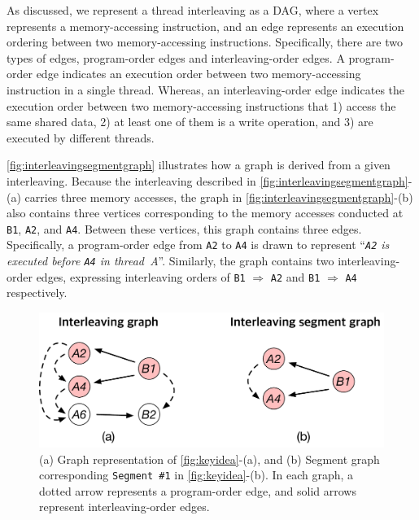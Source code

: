 %




As discussed,
we represent a thread interleaving as a DAG, where
%
a vertex represents a memory-accessing instruction, and an edge
represents an execution ordering between two memory-accessing
instructions.  Specifically, there are two types of edges,
program-order edges and interleaving-order edges.
%
A program-order edge indicates an execution order between two
memory-accessing instruction in a single thread.  Whereas, an
interleaving-order edge indicates the execution order between two
memory-accessing instructions that 1) access the same shared data, 2)
at least one of them is a write operation, and 3) are executed by
different threads.

\autoref{fig:interleavingsegmentgraph} illustrates how a graph is
derived from a given interleaving.
%
Because the interleaving described in
\autoref{fig:interleavingsegmentgraph}-(a) carries three memory
accesses, the graph in \autoref{fig:interleavingsegmentgraph}-(b) also
contains three vertices corresponding to the memory accesses conducted
at \texttt{B1}, \texttt{A2}, and \texttt{A4}.
%
Between these vertices, this graph contains three edges. Specifically,
a program-order edge from \texttt{A2} to \texttt{A4} is drawn to
represent ``\textit{\texttt{A2} is executed before \texttt{A4} in
  thread~A}''.
%
Similarly, the graph contains two interleaving-order edges, expressing
interleaving orders of \texttt{B1} $\Rightarrow$ \texttt{A2} and
\texttt{B1} $\Rightarrow$ \texttt{A4} respectively.



\begin{figure}[t]
  \centering
  \includegraphics[width=0.8\linewidth]{fig/interleavingsegmentgraph.pdf}
  \caption{(a) Graph representation of \autoref{fig:keyidea}-(a), and
    (b) Segment graph corresponding \texttt{Segment \#1} in
    \autoref{fig:keyidea}-(b). In each graph, a dotted arrow
    represents a program-order edge, and solid arrows represent
    interleaving-order edges.}
  \label{fig:interleavingsegmentgraph}
\end{figure}

